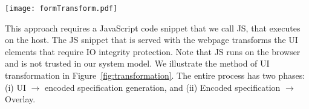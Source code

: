 \begin{figure*}[t]
\centering
\texttt{[image: formTransform.pdf]}
\caption{\textbf{Transformation of UI elements: UI $\rightarrow$ encoded specification $\rightarrow$ \device generated UI overlay.} \one The actual webpage and the corresponding \html source shows the UI elements that requires integrity protection. \two These UI elements are transformed into an encoded UI specification (our \name prototype uses QR code that encodes a UI specification, e.g., Specification~\ref{snippet:UISpecification}) by the \name JS. The QR code. \three AThe QR code decoded and overlaid on the HDMI stream by the \device. \four Upon the user's action on the overlaid UI elements, the device signs all the input data. \five The \device sends these signed input data them to the remote server. Note, that the intermediate QR code transformation (\two) is not visible by the user as it is decoded instantaneously by the device.}
\spacesave
\label{fig:transformation}
\end{figure*}


 
This approach requires a JavaScript code snippet that we call \name JS, that executes on the host. The \name JS snippet that is served with the webpage transforms the UI elements that require IO integrity protection. Note that \name JS runs on the browser and is not trusted in our system model. We illustrate the method of UI transformation in Figure~\ref{fig:transformation}. The entire process has two phases: (i) UI $\rightarrow$ encoded specification generation, and (ii) Encoded specification $\rightarrow$ Overlay.




